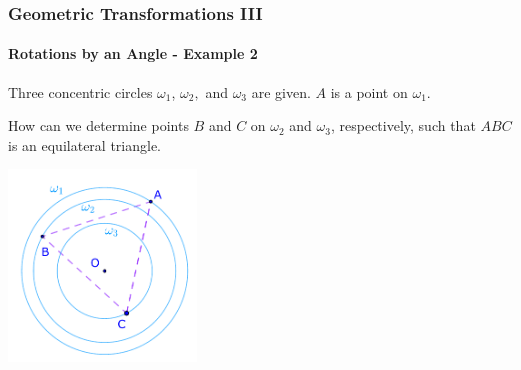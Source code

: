 \documentclass[8pt,xcolor=table,dvipsnames]{beamer}
\begin{document}
\begin{frame}[t]
    \frametitle{Geometric Transformations III}
    \framesubtitle{Rotations by an Angle - Example 2}
    \begin{example}
        Three concentric circles $\omega_1$, $\omega_2,$ and $\omega_3$ are given. $A$ is a point on $\omega_1$.
        
        \bigbreak
        How can we determine points $B$ and $C$ on $\omega_2$ and $\omega_3$, respectively, such that $ABC$ is an equilateral triangle.
    \end{example}

    \begin{center}
        \includegraphics[width=5cm]{./svg/pdf/rotation-5a.pdf}
    \end{center}
\end{frame}
\end{document}
